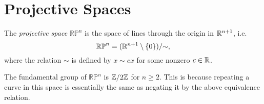 \section{Projective Spaces}
\begin{definition}
  The \emph{projective space} $\mathbb{RP}^n$ is
  the space of lines through the origin in
  $\mathbb{R}^{n + 1}$, i.e.
  \[
    \mathbb{RP}^n = (\mathbb{R}^{n + 1} \setminus \{0\}) / {\sim},
  \]
  where the relation $\sim$ is defined
  by $x \sim cx$ for some nonzero $c \in \mathbb{R}$.
\end{definition}

\begin{remark}
  The fundamental group of
  $\mathbb{RP}^n$ is $\mathbb{Z}/2\mathbb{Z}$ for $n \ge 2$.
  This is because repeating a curve in this
  space is essentially
  the same as negating it by the above equivalence
  relation.
\end{remark}
